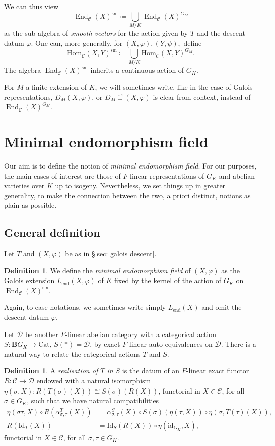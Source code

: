 \documentclass[a4paper,10pt]{amsart}
\theoremstyle{plain}
\theoremstyle{definition}
\newtheorem{definition}[theorem]{Definition}
\theoremstyle{remark}
\def\ul#1{\underline{#1}}
\def\mr#1{\mathrm{#1}}
\def\Ccal{\mathcal{C}}
\def\Dcal{\mathcal{D}}
\def\Bbf{\mathbf{B}}
\renewcommand{\hom}{\mr{Hom}}
\DeclareMathOperator{\End}{End}
\begin{document}
We can thus view 
\[
    \End_{\Ccal}(X)^\mr{sm} \coloneqq \bigcup_{M/K} \End_\Ccal(X)^{G_M}
\]
as the sub-algebra of \emph{smooth vectors} for the action given by \(T\) and the descent datum \(\varphi\). One can, more generally, for \((X, \varphi),  (Y, \psi),\) define
\[
    \hom_{\Ccal}(X, Y)^\mr{sm} \coloneqq \bigcup_{M/K} \hom_\Ccal(X, Y)^{G_M}.
\]
The algebra \(\End_{\Ccal}(X)^\mr{sm}\) inherits a continuous action of \(G_K\).

For \(M\) a finite extension of \(K\), we will sometimes write, like in the case of Galois representations, \(D_M(X, \varphi)\), or \(D_M\) if \((X, \varphi)\) is clear from context, instead of \(\End_{\Ccal}(X)^{G_M}\).

\section{Minimal endomorphism field}\label{section: min endo field}

Our aim is to define the notion of \emph{minimal endomorphism field}. For our purposes, the main cases of interest are those of \(F\)-linear representations of \(G_K\) and abelian varieties over \(K\) up to isogeny. Nevertheless, we set things up in greater generality, to make the connection between the two, a priori distinct, notions as plain as possible.

\subsection{General definition}
Let \(T\) and \((X, \varphi)\) be as in \S\ref{sec: galois descent}.

\begin{definition}\label{def: min endo field}
 We define the \emph{minimal endomorphism field} of \((X, \varphi)\) as the Galois extension \(L_{\mr{end}}(X, \varphi)\) of \(K\) fixed by the kernel of the action of \(G_K\) on \(\End_\Ccal(X)^\mr{sm}\).
\end{definition}
Again, to ease notations, we sometimes write simply \(L_{\mr{end}}(X)\) and omit the descent datum \(\varphi\).

Let \(\Dcal\) be another \(F\)-linear abelian category with a categorical action \(S \colon \Bbf G_K \to \ul{\mr{Cat}}\), \(S(\ast) = \Dcal\), by exact \(F\)-linear auto-equivalences on \(\Dcal\). There is a natural way to relate the categorical actions \(T\) and \(S\). 
\begin{definition}
A \emph{realisation of \(T\) in \(S\)} is the datum of an \(F\)-linear exact functor \(R \colon \Ccal \to \Dcal\) endowed with a natural isomorphism \(\eta(\sigma, X) \colon R(T(\sigma)(X)) \cong S(\sigma)(R(X))\), functorial in \(X \in \Ccal\), for all \(\sigma \in G_K\), such that we have natural compatibilities
\begin{align*}
    \eta(\sigma\tau, X) \circ R(\alpha_{\sigma, \tau}^T(X)) &= \alpha_{\sigma, \tau}^S(X) \circ S(\sigma)(\eta(\tau, X)) \circ \eta(\sigma, T(\tau)(X)),\\
    R(\mr{Id}_T(X)) &= \mr{Id}_S(R(X)) \circ \eta(\mr{id}_{G_K}, X),
\end{align*}
functorial in \(X \in \Ccal\), for all \(\sigma, \tau \in G_K\).
\end{definition}
\end{document}
